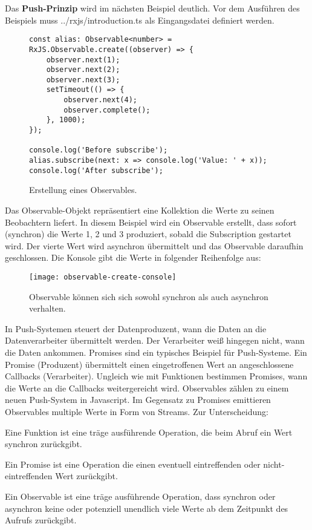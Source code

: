 \noindent
Das \textbf{Push-Prinzip} wird im nächsten Beispiel deutlich. Vor dem Ausführen des Beispiels muss ../rxjs/introduction.ts als Eingangsdatei definiert werden.

\begin{figure}[H]
\begin{lstlisting}[basicstyle=\small]
const alias: Observable<number> = RxJS.Observable.create((observer) => {
    observer.next(1);
    observer.next(2);
    observer.next(3);
    setTimeout(() => {
        observer.next(4);
        observer.complete();
    }, 1000);
});

console.log('Before subscribe');
alias.subscribe(next: x => console.log('Value: ' + x));
console.log('After subscribe');
\end{lstlisting}
\caption{Erstellung eines Observables.}
\label{creation-of-observable-first-example}
\end{figure}

\noindent
Das Observable-Objekt repräsentiert eine Kollektion die Werte zu seinen Beobachtern liefert. In diesem Beispiel wird ein Observable erstellt, dass sofort (synchron) die Werte 1, 2 und 3 produziert, sobald die Subscription gestartet wird. Der vierte Wert wird asynchron übermittelt und das Observable daraufhin geschlossen. Die Konsole gibt die Werte in folgender Reihenfolge aus:

\begin{figure}[H]
\begin{center}
\texttt{[image: observable-create-console]}
\end{center}
\caption{Observable können sich sich sowohl synchron als auch asynchron verhalten.}
\end{figure}

\noindent
In Push-Systemen steuert der Datenproduzent, wann die Daten an die Datenverarbeiter übermittelt werden. Der Verarbeiter weiß hingegen nicht, wann die Daten ankommen. Promises sind ein typisches Beispiel für Push-Systeme. Ein Promise (Produzent) übermittelt einen eingetroffenen Wert an angeschlossene Callbacks (Verarbeiter). Ungleich wie mit Funktionen bestimmen Promises, wann die Werte an die Callbacks weitergereicht wird. Observables zählen zu einem neuen Push-System in Javascript. Im Gegensatz zu Promises emittieren Observables multiple Werte in Form von Streams. Zur Unterscheidung:

\begin{description}
\item Eine Funktion ist eine träge ausführende Operation, die beim Abruf ein Wert synchron zurückgibt.
\item Ein Promise ist eine Operation die einen eventuell eintreffenden oder nicht-eintreffenden Wert zurückgibt.
\item Ein Observable ist eine träge ausführende Operation, dass synchron oder asynchron keine oder potenziell unendlich viele Werte ab dem Zeitpunkt des Aufrufs zurückgibt.
\end{description}

